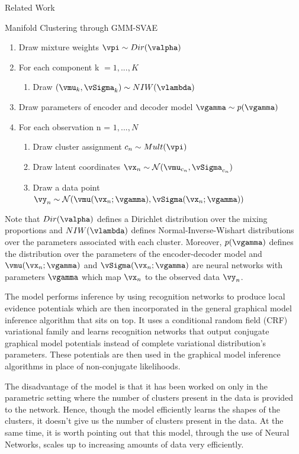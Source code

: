 \documentclass{article}
\begin{document}
\begin{psection}{Related Work}
\begin{psubsection}{Manifold Clustering through GMM-SVAE}
\begin{enumerate}
    \item Draw mixture weights $\vpi \sim Dir(\valpha)$
    \item For each component k $= 1,...,K$
    \begin{enumerate}
        \item Draw $(\vmu_k,\vSigma_k) \sim NIW(\vlambda)$
    \end{enumerate}
    \item Draw parameters of encoder and decoder model $\vgamma \sim p(\vgamma)$
    \item For each observation n = $ 1,...,N$
    \begin{enumerate}
        \item Draw cluster assignment $c_n \sim Mult(\vpi)$
        \item Draw latent coordinates $\vx_n \sim \mathcal{N}(\vmu_{c_n}, \vSigma_{c_n})$
        \item Draw a data point $\vy_n \sim \mathcal{N}(\vmu(\vx_n ; \vgamma), \vSigma(\vx_n;\vgamma)) $
    \end{enumerate}
\end{enumerate}

Note that $Dir(\valpha)$ defines a Dirichlet distribution over the mixing proportions and $NIW(\vlambda)$ defines Normal-Inverse-Wishart distributions over the parameters associated with each cluster. Moreover, $p(\vgamma)$ defines the distribution over the parameters of the encoder-decoder model and $\vmu(\vx_n;\vgamma)$ and $\vSigma(\vx_n;\vgamma)$ are neural networks with parameters $\vgamma$ which map $\vx_n$ to the observed data $\vy_n$.

The model performs inference by using recognition networks to produce local evidence potentials which are then incorporated in the general graphical model inference algorithm that sits on top. It uses a conditional random field (CRF) variational family and learns recognition networks that output conjugate graphical model potentials instead of complete variational distribution's parameters. These potentials are then used in the graphical model inference algorithms in place of non-conjugate likelihoods. 

The disadvantage of the model is that it has been worked on only in the parametric setting where the number of clusters present in the data is provided to the network. Hence, though the model efficiently learns the shapes of the clusters, it doesn't give us the number of clusters present in the data. At the same time, it is worth pointing out that this model, through the use of Neural Networks, scales up to increasing amounts of data very efficiently.
\end{psubsection}
\end{psection}
\end{document}
